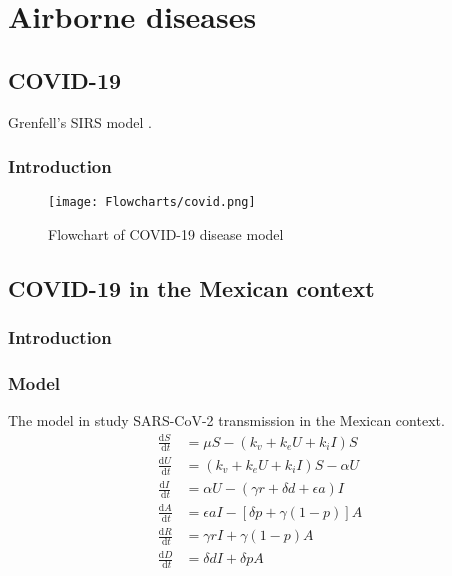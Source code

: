\documentclass{book}\usepackage[]{graphicx}\usepackage[]{color}
\begin{document}


\chapter{Airborne diseases}
\label{chapt:airborne}

\section{COVID-19}
Grenfell's SIRS model \cite{baker2020susceptible}.
\subsection*{Introduction}
\begin{figure}[H]
    \centering
    \texttt{[image: Flowcharts/covid.png]}
    \caption{Flowchart of COVID-19 disease model}
    \label{fig:covid19_flow}
\end{figure}


\section{COVID-19 in the Mexican context}
\subsection{Introduction}
\subsection{Model}
The model in \cite{santamaria2020possible} study SARS-CoV-2 transmission in the Mexican context.
\begin{align}
\frac{\mathrm{d} S}{\mathrm{~d} t}&=\mu S-\left(k_{v}+k_{e} U+k_{i} I\right) S \\
\frac{\mathrm{d} U}{\mathrm{~d} t}&=\left(k_{v}+k_{e} U+k_{i} I\right) S-\alpha U \\
\frac{\mathrm{d} I}{\mathrm{~d} t}&=\alpha U-(\gamma r+\delta d+\epsilon a) I \\
\frac{\mathrm{d} A}{\mathrm{~d} t}&=\epsilon a I-[\delta p+\gamma(1-p)] A \\
\frac{\mathrm{d} R}{\mathrm{~d} t}&=\gamma r I+\gamma(1-p) A \\
\frac{\mathrm{d} D}{\mathrm{~d} t}&=\delta d I+\delta p A
\end{align}
\end{document}

